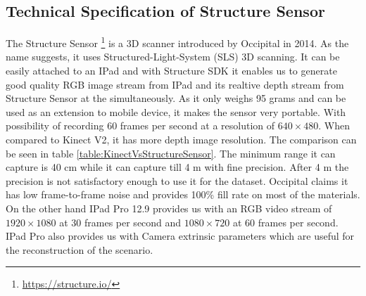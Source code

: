 \subsection{Technical Specification of Structure Sensor}
The Structure Sensor \footnote{\url{https://structure.io/}} is a 3D scanner introduced by Occipital in 2014. As the name suggests, it uses Structured-Light-System (SLS) 3D scanning\cite{Kalantari}. It can be easily attached to an IPad and with Structure SDK it enables us to generate good quality RGB image stream from IPad and its realtive depth stream from Structure Sensor at the simultaneously. As it only weighs 95 grams and can be used as an extension to mobile device, it makes the sensor very portable. With possibility of recording 60 frames per second at a resolution of $640\times480$\cite{Kalantari}. When compared to Kinect V2, it has more depth image resolution. The comparison can be seen in table \ref{table:KinectVsStructureSensor}. The minimum range it can capture is 40 cm while it can capture till 4 m with fine precision. After 4 m the precision is not satisfactory enough to use it for the dataset. Occipital claims it has low frame-to-frame noise and provides 100\% fill rate on most of the materials. On the other hand IPad Pro 12.9 provides us with an RGB video stream of $1920\times1080$ at 30 frames per second and $1080\times720$ at 60 frames per second. IPad Pro also provides us with Camera extrinsic parameters which are useful for the reconstruction of the scenario.\\

